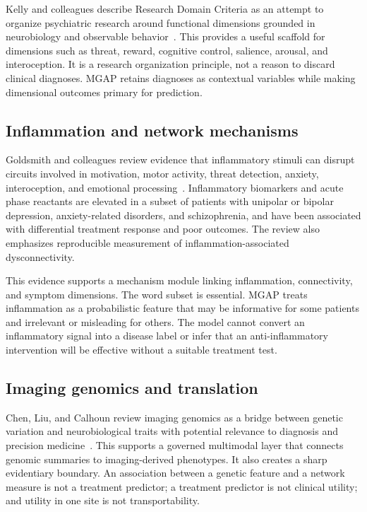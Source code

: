 \documentclass[conference]{IEEEtran}
\begin{document}
Kelly and colleagues describe Research Domain Criteria as an attempt to organize psychiatric research around functional dimensions grounded in neurobiology and observable behavior~\cite{kelly2018}. This provides a useful scaffold for dimensions such as threat, reward, cognitive control, salience, arousal, and interoception. It is a research organization principle, not a reason to discard clinical diagnoses. MGAP retains diagnoses as contextual variables while making dimensional outcomes primary for prediction.

\subsection{Inflammation and network mechanisms}
Goldsmith and colleagues review evidence that inflammatory stimuli can disrupt circuits involved in motivation, motor activity, threat detection, anxiety, interoception, and emotional processing~\cite{goldsmith2023}. Inflammatory biomarkers and acute phase reactants are elevated in a subset of patients with unipolar or bipolar depression, anxiety-related disorders, and schizophrenia, and have been associated with differential treatment response and poor outcomes. The review also emphasizes reproducible measurement of inflammation-associated dysconnectivity.

This evidence supports a mechanism module linking inflammation, connectivity, and symptom dimensions. The word subset is essential. MGAP treats inflammation as a probabilistic feature that may be informative for some patients and irrelevant or misleading for others. The model cannot convert an inflammatory signal into a disease label or infer that an anti-inflammatory intervention will be effective without a suitable treatment test.

\subsection{Imaging genomics and translation}
Chen, Liu, and Calhoun review imaging genomics as a bridge between genetic variation and neurobiological traits with potential relevance to diagnosis and precision medicine~\cite{chen2019}. This supports a governed multimodal layer that connects genomic summaries to imaging-derived phenotypes. It also creates a sharp evidentiary boundary. An association between a genetic feature and a network measure is not a treatment predictor; a treatment predictor is not clinical utility; and utility in one site is not transportability.
\end{document}
